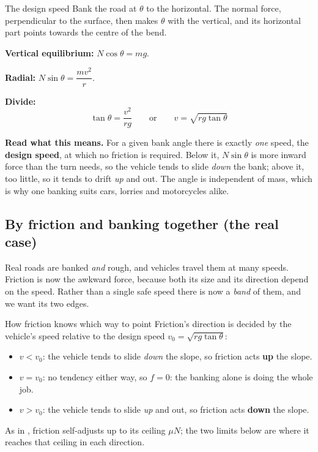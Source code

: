 \begin{derivbox}{The design speed}
Bank the road at $\theta$ to the horizontal. The normal force, perpendicular to the surface, then makes
$\theta$ with the vertical, and its horizontal part points towards the centre of the bend.

 \textbf{Vertical equilibrium:} $N\cos\theta=mg$.

 \textbf{Radial:} $N\sin\theta=\dfrac{mv^{2}}{r}$.

 \textbf{Divide:}
\[
\boxed{\;\tan\theta=\frac{v^{2}}{rg}\qquad\text{or}\qquad v=\sqrt{rg\tan\theta}\;}
\]


\smallskip
\textbf{Read what this means.} For a given bank angle there is exactly \emph{one} speed, the
\textbf{design speed}, at which no friction is required. Below it, $N\sin\theta$ is more
inward force than the turn needs, so the vehicle tends to slide \emph{down} the bank; above it, too
little, so it tends to drift \emph{up} and out. The angle is independent of mass, which is why one
banking suits cars, lorries and motorcycles alike.
\end{derivbox}

\subsection{By friction and banking together (the real case)}
Real roads are banked \emph{and} rough, and vehicles travel them at many speeds. Friction is now the
awkward force, because both its size and its direction depend on the speed. Rather than a single safe speed there
is now a \emph{band} of them, and we want its two edges.

\begin{motivbox}{How friction knows which way to point}
Friction's direction is decided by the vehicle's speed relative to the design speed
$v_0=\sqrt{rg\tan\theta}$:
\begin{itemize}
\item $v<v_0$: the vehicle tends to slide \emph{down} the slope, so friction acts \textbf{up} the slope.
\item $v=v_0$: no tendency either way, so $f=0$: the banking alone is doing the whole job.
\item $v>v_0$: the vehicle tends to slide \emph{up} and out, so friction acts \textbf{down} the slope.
\end{itemize}
As in , friction self-adjusts up to its ceiling $\mu N$; the two limits below are
where it reaches that ceiling in each direction.
\end{motivbox}

